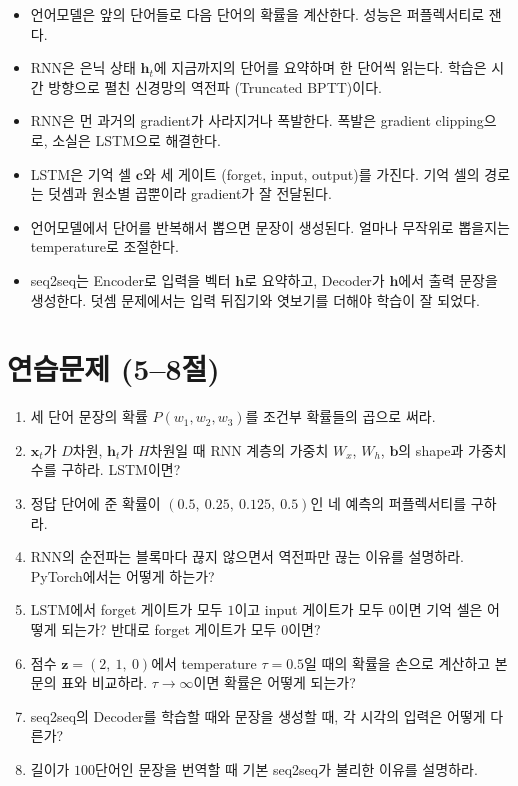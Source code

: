 \documentclass[11pt,a4paper]{article}
\newcommand{\vect}[1]{\bm{#1}}
\begin{document}
\begin{mlbox}[5--8절 정리]
\begin{itemize}[leftmargin=1.5em]
\item 언어모델은 앞의 단어들로 다음 단어의 확률을 계산한다. 성능은 퍼플렉서티로 잰다.
\item RNN은 은닉 상태 $\vect h_t$에 지금까지의 단어를 요약하며 한 단어씩 읽는다. 학습은 시간 방향으로 펼친 신경망의 역전파 (Truncated BPTT)이다.
\item RNN은 먼 과거의 gradient가 사라지거나 폭발한다. 폭발은 gradient clipping으로, 소실은 LSTM으로 해결한다.
\item LSTM은 기억 셀 $\vect c$와 세 게이트 (forget, input, output)를 가진다. 기억 셀의 경로는 덧셈과 원소별 곱뿐이라 gradient가 잘 전달된다.
\item 언어모델에서 단어를 반복해서 뽑으면 문장이 생성된다. 얼마나 무작위로 뽑을지는 temperature로 조절한다.
\item seq2seq는 Encoder로 입력을 벡터 $\vect h$로 요약하고, Decoder가 $\vect h$에서 출력 문장을 생성한다. 덧셈 문제에서는 입력 뒤집기와 엿보기를 더해야 학습이 잘 되었다.
\end{itemize}
\end{mlbox}

\section*{연습문제 (5--8절)}

\begin{enumerate}[label=\arabic*.,resume]
\item 세 단어 문장의 확률 $P(w_1,w_2,w_3)$를 조건부 확률들의 곱으로 써라.
\item $\vect x_t$가 $D$차원, $\vect h_t$가 $H$차원일 때 RNN 계층의 가중치 $W_x$, $W_h$, $\vect b$의 shape과 가중치 수를 구하라. LSTM이면?
\item 정답 단어에 준 확률이 $(0.5,\ 0.25,\ 0.125,\ 0.5)$인 네 예측의 퍼플렉서티를 구하라.
\item RNN의 순전파는 블록마다 끊지 않으면서 역전파만 끊는 이유를 설명하라. PyTorch에서는 어떻게 하는가?
\item LSTM에서 forget 게이트가 모두 $1$이고 input 게이트가 모두 $0$이면 기억 셀은 어떻게 되는가? 반대로 forget 게이트가 모두 $0$이면?
\item 점수 $\vect z=(2,\ 1,\ 0)$에서 temperature $\tau=0.5$일 때의 확률을 손으로 계산하고 본문의 표와 비교하라. $\tau\to\infty$이면 확률은 어떻게 되는가?
\item seq2seq의 Decoder를 학습할 때와 문장을 생성할 때, 각 시각의 입력은 어떻게 다른가?
\item 길이가 $100$단어인 문장을 번역할 때 기본 seq2seq가 불리한 이유를 설명하라.
\end{enumerate}
\end{document}
